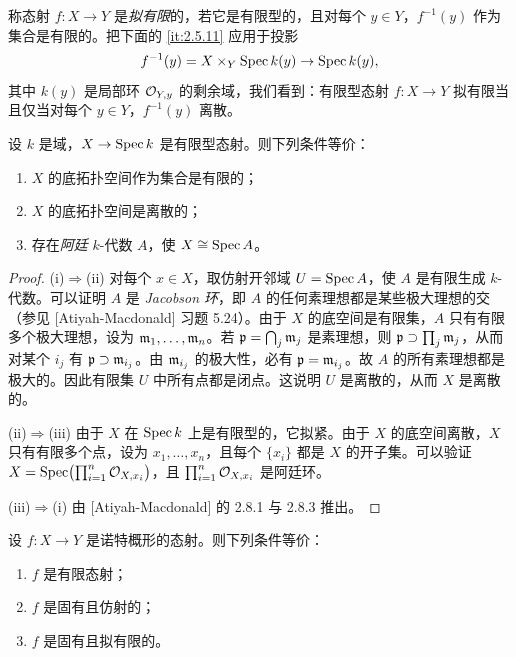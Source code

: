 称态射 $f\colon X\to Y$ 是\emph{拟有限}的，若它是有限型的，且对每个 $y\in Y$，$f^{-1}(y)$ 作为集合是有限的。把下面的 \ref{it:2.5.11} 应用于投影
\[
f^{-1}(y)=X\times_Y\operatorname{Spec} k(y)\to\operatorname{Spec} k(y),
\]
其中 $k(y)$ 是局部环 $\mathcal{O}_{Y,y}$ 的剩余域，我们看到：有限型态射 $f\colon X\to Y$ 拟有限当且仅当对每个 $y\in Y$，$f^{-1}(y)$ 离散。
\begin{lemma}\label{it:2.5.11}
设 $k$ 是域，$X\to\operatorname{Spec} k$ 是有限型态射。则下列条件等价：
\begin{enumerate}[label=(\roman*)]
\item $X$ 的底拓扑空间作为集合是有限的；
\item $X$ 的底拓扑空间是离散的；
\item 存在\emph{阿廷} $k$-代数 $A$，使 $X\cong\operatorname{Spec} A$。
\end{enumerate}
\end{lemma}

\begin{proof}
(i)$\Rightarrow$(ii) 对每个 $x\in X$，取仿射开邻域 $U=\operatorname{Spec} A$，使 $A$ 是有限生成 $k$-代数。可以证明 $A$ 是 \emph{Jacobson 环}，即 $A$ 的任何素理想都是某些极大理想的交（参见 [Atiyah-Macdonald] 习题 5.24）。由于 $X$ 的底空间是有限集，$A$ 只有有限多个极大理想，设为 $\mathfrak{m}_1,\dots,\mathfrak{m}_n$。若 $\mathfrak{p}=\bigcap_j\mathfrak{m}_j$ 是素理想，则 $\mathfrak{p}\supset\prod_j\mathfrak{m}_j$，从而对某个 $i_j$ 有 $\mathfrak{p}\supset\mathfrak{m}_{i_j}$。由 $\mathfrak{m}_{i_j}$ 的极大性，必有 $\mathfrak{p}=\mathfrak{m}_{i_j}$。故 $A$ 的所有素理想都是极大的。因此有限集 $U$ 中所有点都是闭点。这说明 $U$ 是离散的，从而 $X$ 是离散的。

(ii)$\Rightarrow$(iii) 由于 $X$ 在 $\operatorname{Spec} k$ 上是有限型的，它拟紧。由于 $X$ 的底空间离散，$X$ 只有有限多个点，设为 $x_1,\dots,x_n$，且每个 $\{x_i\}$ 都是 $X$ 的开子集。可以验证 $X=\operatorname{Spec}\bigl(\prod_{i=1}^n\mathcal{O}_{X,x_i}\bigr)$，且 $\prod_{i=1}^n\mathcal{O}_{X,x_i}$ 是阿廷环。

(iii)$\Rightarrow$(i) 由 [Atiyah-Macdonald] 的 2.8.1 与 2.8.3 推出。
\end{proof}

\begin{proposition}\label{it:2.5.12}
设 $f\colon X\to Y$ 是诺特概形的态射。则下列条件等价：
\begin{enumerate}[label=(\roman*)]
\item $f$ 是有限态射；
\item $f$ 是固有且仿射的；
\item $f$ 是固有且拟有限的。
\end{enumerate}
\end{proposition}

